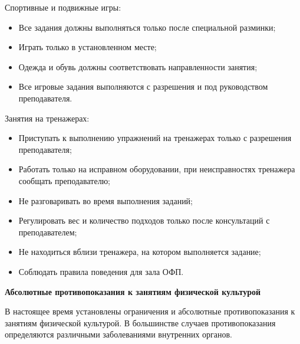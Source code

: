 \begin{flushleft}
Спортивные и подвижные игры:
\begin{itemize}
    \item Все задания должны выполняться только после специальной разминки;
    \item Играть только в установленном месте;
    \item Одежда и обувь должны соответствовать направленности занятия;
    \item Все игровые задания выполняются с разрешения и под руководством преподава­теля.
\end{itemize}
\newpage

Занятия на тренажерах:
\begin{itemize}
    \item Приступать к выполнению упражнений на тренажерах только с разрешения пре­подавателя;
    \item Работать только на исправном оборудовании, при неисправностях тренажера со­общать преподавателю;
    \item Не разговаривать во время выполнения заданий;
    \item Регулировать вес и количество подходов только после консультаций с преподавателем;
    \item Не находиться вблизи тренажера, на котором выполняется задание;
    \item Соблюдать правила поведения для зала ОФП.
\end{itemize}
\vspace*{14pt}

\newpage
\begin{center}
    \textbf{Абсолютные противопоказания к занятиям физической культурой}
\end{center}
\vspace*{14pt}

В настоящее время установлены ограничения и абсолютные
противопоказания к занятиям физической культурой. В
большинстве случаев противопоказания определяются различными
заболеваниями внутренних органов.
\vspace*{14pt}


\end{flushleft}
